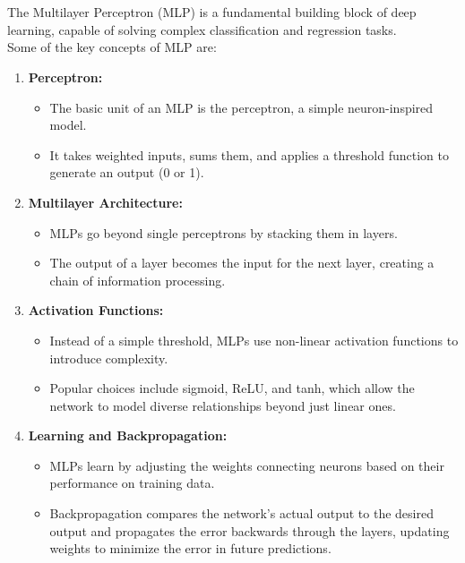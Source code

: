 \documentclass{article}
\begin{document}
   \section{}
    \begin{flushleft}
        \noindent
        \large{
        The Multilayer Perceptron (MLP) is a fundamental building block of deep learning, capable of solving complex classification and regression tasks. \\ 
        \noindent  Some of the key concepts of MLP are:}



        \begin{enumerate}
            \item \textbf{Perceptron:}
                \begin{itemize}
                    \item The basic unit of an MLP is the perceptron, a simple neuron-inspired model.
                    \item It takes weighted inputs, sums them, and applies a threshold function to generate an output (0 or 1).
                \end{itemize}
            \item \textbf{Multilayer Architecture:}
                \begin{itemize}
                    \item MLPs go beyond single perceptrons by stacking them in layers.
                    \item The output of a layer becomes the input for the next layer, creating a chain of information processing.
                \end{itemize}

            \item \textbf{Activation Functions:}
                \begin{itemize}
                    \item Instead of a simple threshold, MLPs use non-linear activation functions to introduce complexity.
                    \item Popular choices include sigmoid, ReLU, and tanh, which allow the network to model diverse relationships beyond just linear ones.
                \end{itemize}

            \item \textbf{Learning and Backpropagation:}
                \begin{itemize}
                    \item MLPs learn by adjusting the weights connecting neurons based on their performance on training data.
                    \item Backpropagation compares the network's actual output to the desired output and propagates the error backwards through the layers, updating weights to minimize the error in future predictions.
                \end{itemize}


\end{enumerate}
\end{flushleft}
\end{document}
